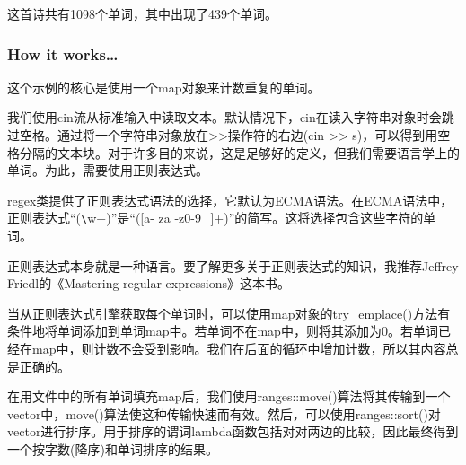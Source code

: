 这首诗共有1098个单词，其中出现了439个单词。

\subsubsection{How it works…}

这个示例的核心是使用一个map对象来计数重复的单词。

我们使用cin流从标准输入中读取文本。默认情况下，cin在读入字符串对象时会跳过空格。通过将一个字符串对象放在>{}>操作符的右边(cin >{}> s)，可以得到用空格分隔的文本块。对于许多目的来说，这是足够好的定义，但我们需要语言学上的单词。为此，需要使用正则表达式。

regex类提供了正则表达式语法的选择，它默认为ECMA语法。在ECMA语法中，正则表达式“(\verb|\|w+)”是“([a- za -z0-9\_]+)”的简写。这将选择包含这些字符的单词。

正则表达式本身就是一种语言。要了解更多关于正则表达式的知识，我推荐Jeffrey Friedl的《Mastering regular expressions》这本书。

当从正则表达式引擎获取每个单词时，可以使用map对象的try\_emplace()方法有条件地将单词添加到单词map中。若单词不在map中，则将其添加为0。若单词已经在map中，则计数不会受到影响。我们在后面的循环中增加计数，所以其内容总是正确的。

在用文件中的所有单词填充map后，我们使用ranges::move()算法将其传输到一个vector中，move()算法使这种传输快速而有效。然后，可以使用ranges::sort()对vector进行排序。用于排序的谓词lambda函数包括对对两边的比较，因此最终得到一个按字数(降序)和单词排序的结果。


